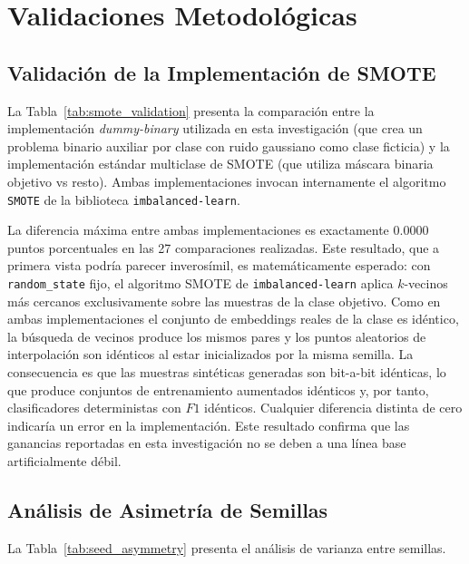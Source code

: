 
\chapter{Validaciones Metodológicas}
\label{ch:appendix_validaciones}

\section{Validación de la Implementación de SMOTE}
\label{sec:validacion_smote}

La Tabla~\ref{tab:smote_validation} presenta la comparación entre la implementación \textit{dummy-binary} utilizada en esta investigación (que crea un problema binario auxiliar por clase con ruido gaussiano como clase ficticia) y la implementación estándar multiclase de SMOTE (que utiliza máscara binaria objetivo vs resto). Ambas implementaciones invocan internamente el algoritmo \texttt{SMOTE} de la biblioteca \texttt{imbalanced-learn}.



La diferencia máxima entre ambas implementaciones es exactamente $0.0000$ puntos porcentuales en las 27 comparaciones realizadas. Este resultado, que a primera vista podría parecer inverosímil, es matemáticamente esperado: con \texttt{random\_state} fijo, el algoritmo SMOTE de \texttt{imbalanced-learn} aplica $k$-vecinos más cercanos exclusivamente sobre las muestras de la clase objetivo. Como en ambas implementaciones el conjunto de embeddings reales de la clase es idéntico, la búsqueda de vecinos produce los mismos pares y los puntos aleatorios de interpolación son idénticos al estar inicializados por la misma semilla. La consecuencia es que las muestras sintéticas generadas son bit-a-bit idénticas, lo que produce conjuntos de entrenamiento aumentados idénticos y, por tanto, clasificadores deterministas con $F1$ idénticos. Cualquier diferencia distinta de cero indicaría un error en la implementación. Este resultado confirma que las ganancias reportadas en esta investigación no se deben a una línea base artificialmente débil.

\section{Análisis de Asimetría de Semillas}
\label{sec:asimetria_semillas}

La Tabla~\ref{tab:seed_asymmetry} presenta el análisis de varianza entre semillas.

